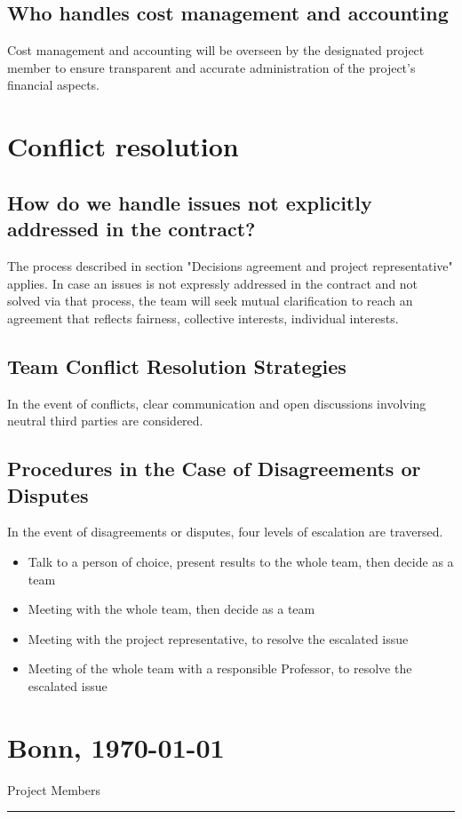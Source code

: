 \documentclass{article}
\begin{document}
\subsection{Who handles cost management and accounting}
Cost management and accounting will be overseen by the designated project member to ensure transparent and accurate administration of the project's financial aspects.

\section{Conflict resolution}
\subsection{How do we handle issues not explicitly addressed in the contract?}
The process described in section "Decisions agreement and project representative" applies.
In case an issues is not expressly addressed in the contract and not solved via that process, the team will seek mutual clarification to reach an agreement that reflects fairness, collective interests, individual interests.
\subsection{Team Conflict Resolution Strategies}
In the event of conflicts, clear communication and open discussions involving neutral third parties are considered.
\subsection{Procedures in the Case of Disagreements or Disputes}
In the event of disagreements or disputes, four levels of escalation are traversed.
\begin{itemize}
    \item Talk to a person of choice, present results to the whole team, then decide as a team
    \item Meeting with the whole team, then decide as a team
    \item Meeting with the project representative, to resolve the escalated issue
    \item Meeting of the whole team with a responsible Professor, to resolve the escalated issue
\end{itemize}

\vfill
\section*{Bonn, \today}

\begin{minipage}{1\textwidth}
	\centering
	Project Members
	\hrule
\end{minipage}
\end{document}
